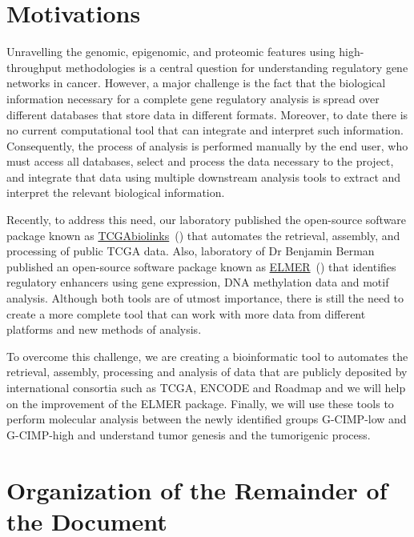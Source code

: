 \section{Motivations}

Unravelling the genomic, epigenomic, and proteomic features using high-throughput methodologies is a central question for understanding regulatory gene networks in cancer. However, a major challenge is the fact that the biological information necessary for a complete gene regulatory analysis is spread over different databases that store data in different formats. Moreover, to date there is no current computational tool that can integrate and interpret such information. Consequently, the process of analysis is performed manually by the end user, who must access all databases, select and process the data necessary to the project, and integrate that data using multiple downstream analysis tools to extract and interpret the relevant biological information. 

Recently, to address this need, our laboratory published the open-source software package known as \href{http://bioconductor.org/packages/TCGAbiolinks/}{TCGAbiolinks}~(\cite{TCGAbiolinks}) that automates the retrieval, assembly, and processing of public TCGA data. Also, laboratory of Dr Benjamin Berman published an open-source software package known as \href{http://bioconductor.org/packages/ELMER/}{ELMER}~(\cite{yao2015inferring}) that identifies regulatory enhancers using gene expression, DNA methylation data and motif analysis. Although both tools are of utmost importance, there is still the need to create a more complete tool that can work with more data from different platforms and new methods of analysis.

To overcome this challenge, we are creating a bioinformatic tool to automates the retrieval, assembly, processing and analysis of data that are publicly deposited by international consortia such as TCGA, ENCODE and Roadmap and we will help on the improvement of the ELMER package. Finally, we will use these tools to perform molecular analysis between the newly identified groups G-CIMP-low and G-CIMP-high and understand tumor genesis and the tumorigenic process. 



\section{Organization of the Remainder of the Document}

